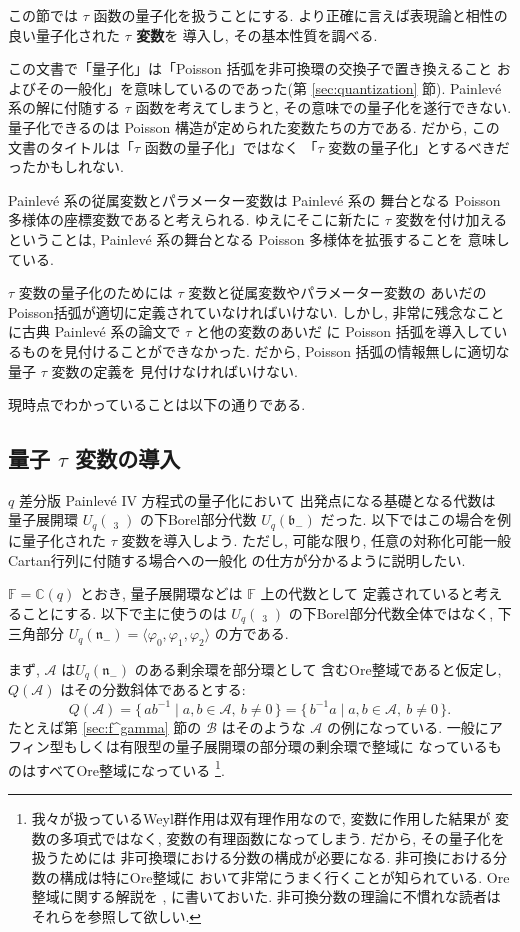 \documentclass[12pt,twoside,dvipdfm]{msjproc}
\newcommand\F{{\mathbb F}} %
\newcommand\C{{\mathbb C}} %
\theoremstyle{definition} %
\theoremstyle{definition} %
\theoremstyle{definition} %
\numberwithin{theorem}{section}
\numberwithin{equation}{section}
\numberwithin{figure}{section}
\numberwithin{table}{section}
\newcommand\secref[1]{第 \ref{#1} 節}
\newcommand\bor{\mathfrak{b}}
\newcommand\nil{\mathfrak{n}}
\newcommand\bra{\langle}
\newcommand\ket{\rangle}
\newcommand\A{\mathcal{A}}
\newcommand\B{\mathcal{B}}
\newcommand\glhat{\mathop{\widehat{\mathrm{gl}}}\nolimits}
\begin{document}
この節では $\tau$ 函数の量子化を扱うことにする.
より正確に言えば表現論と相性の良い量子化された {\bf $\tau$ 変数}を
導入し, その基本性質を調べる.

この文書で「量子化」は「Poisson 括弧を非可換環の交換子で置き換えること
およびその一般化」を意味しているのであった(\secref{sec:quantization}).
Painlev\'e 系の解に付随する $\tau$ 函数を考えてしまうと, 
その意味での量子化を遂行できない.
量子化できるのは Poisson 構造が定められた変数たちの方である.
だから, この文書のタイトルは「$\tau$ 函数の量子化」ではなく
「$\tau$ 変数の量子化」とするべきだったかもしれない.

Painlev\'e 系の従属変数とパラメーター変数は Painlev\'e 系の
舞台となる Poisson 多様体の座標変数であると考えられる.
ゆえにそこに新たに $\tau$ 変数を付け加えるということは,
Painlev\'e 系の舞台となる Poisson 多様体を拡張することを
意味している. 

$\tau$ 変数の量子化のためには $\tau$ 変数と従属変数やパラメーター変数の
あいだのPoisson括弧が適切に定義されていなければいけない.
しかし, 非常に残念なことに古典 Painlev\'e 系の論文で $\tau$ と他の変数のあいだ
に Poisson 括弧を導入しているものを見付けることができなかった.
だから, Poisson 括弧の情報無しに適切な量子 $\tau$ 変数の定義を
見付けなければいけない.

現時点でわかっていることは以下の通りである.



\subsection{量子 $\tau$ 変数の導入}

$q$ 差分版 Painlev\'e IV 方程式の量子化において
出発点になる基礎となる代数は
量子展開環 $U_q(\glhat_3)$ の下Borel部分代数 $U_q(\bor_-)$ だった. 
以下ではこの場合を例に量子化された $\tau$ 変数を導入しよう.
ただし, 可能な限り, 任意の対称化可能一般Cartan行列に付随する場合への一般化
の仕方が分かるように説明したい.

$\F=\C(q)$ とおき, 量子展開環などは $\F$ 上の代数として
定義されていると考えることにする.
以下で主に使うのは $U_q(\glhat_3)$ の下Borel部分代数全体ではなく, 
下三角部分 $U_q(\nil_-)=\bra\varphi_0,\varphi_1,\varphi_2\ket$
の方である.

まず, $\A$ は$U_q(\nil_-)$ のある剰余環を部分環として
含むOre整域であると仮定し, $Q(\A)$ はその分数斜体であるとする:
\begin{equation*}
 Q(\A) 
 = \{\, ab^{-1} \mid a,b\in\A,\ b\ne0 \,\}
 = \{\, b^{-1}a \mid a,b\in\A,\ b\ne0 \,\}.
\end{equation*}
たとえば\secref{sec:f^gamma}の $\B$ はそのような $\A$ の例になっている.
一般にアフィン型もしくは有限型の量子展開環の部分環の剰余環で整域に
なっているものはすべてOre整域になっている%
\footnote{我々が扱っているWeyl群作用は双有理作用なので, 変数に作用した結果が
変数の多項式ではなく, 変数の有理函数になってしまう. だから, その量子化を扱うためには
非可換環における分数の構成が必要になる. 非可換における分数の構成は特にOre整域に
おいて非常にうまく行くことが知られている.
Ore整域に関する解説を \cite{Kuroki-localization}, \cite{Kuroki-Ore} に書いておいた.
非可換分数の理論に不慣れな読者はそれらを参照して欲しい.}.
\end{document}
